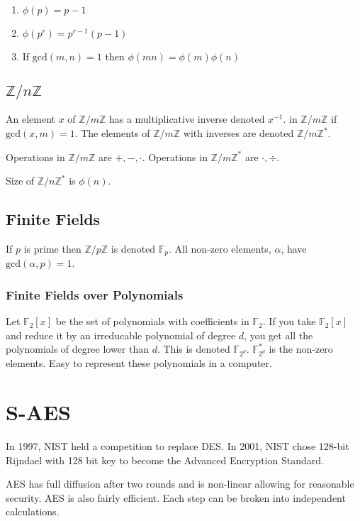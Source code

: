 \documentclass{article}
\begin{document}
\begin{enumerate}
  \item $\phi(p) = p-1$
  \item $\phi(p^r) = p^{r-1}(p-1)$
  \item If $\text{gcd}(m,n) = 1$ then $\phi(mn)= \phi(m) \phi(n)$
\end{enumerate}

\subsection{$\mathbb{Z} / n\mathbb{Z}$}
An element $x$ of $\mathbb{Z}/m\mathbb{Z}$ has a multiplicative inverse denoted
$x^{-1}$. in $\mathbb{Z}/m\mathbb{Z}$ if $\text{gcd}(x,m)=1$. The elements of
$\mathbb{Z}/m\mathbb{Z}$ with inverses are denoted $\mathbb{Z}/m\mathbb{Z}^*$.

Operations in $\mathbb{Z}/m\mathbb{Z}$ are $+, -, \cdot$. Operations in
$\mathbb{Z}/m\mathbb{Z}^*$ are $\cdot, \div$.

Size of $\mathbb{Z}/n\mathbb{Z}^*$ is $\phi(n)$.

\subsection{Finite Fields}
If $p$ is prime then $\mathbb{Z}/p\mathbb{Z}$ is denoted $\mathbb{F}_p$. All
non-zero elements, $\alpha$, have $\text{gcd}(\alpha, p) = 1$.

\subsubsection{Finite Fields over Polynomials}
Let $\mathbb{F}_2[x]$ be the set of polynomials with coefficients in
$\mathbb{F}_2$. If you take $\mathbb{F}_2[x]$ and reduce it by an irreducable
polynomial of degree $d$, you get all the polynomials of degree lower than $d$.
This is denoted $\mathbb{F}_{2^d}$. $\mathbb{F}_{2^d}^{*}$ is the non-zero
elements. Easy to represent these polynomials in a computer.

\section{S-AES}
In 1997, NIST held a competition to replace DES. In 2001, NIST chose 128-bit
Rijndael with 128 bit key to become the Advanced Encryption Standard.

AES has full diffusion after two rounds and is non-linear allowing for
reasonable security. AES is also fairly efficient. Each step can be broken into
independent calculations.
\end{document}
